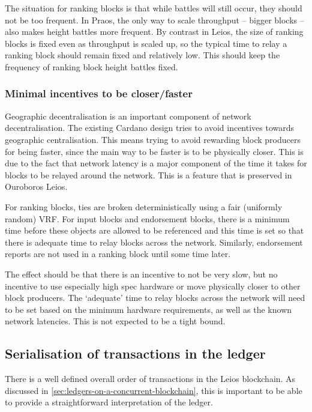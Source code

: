 \documentclass[11pt,a4paper]{article}
\begin{document}
The situation for ranking blocks is that while battles will still occur, they
should not be too frequent. In Praos, the only way to scale throughput --
bigger blocks -- also makes height battles more frequent. By contrast in Leios,
the size of ranking blocks is fixed even as throughput is scaled up, so the
typical time to relay a ranking block should remain fixed and relatively low.
This should keep the frequency of ranking block height battles fixed.

\subsubsection{Minimal incentives to be closer/faster}
Geographic decentralisation is an important component of network
decentralisation. The existing Cardano design tries to avoid incentives
towards geographic centralisation. This means trying to avoid rewarding block
producers for being faster, since the main way to be faster is to be physically
closer. This is due to the fact that network latency is a major component of
the time it takes for blocks to be relayed around the network. This is a
feature that is preserved in Ouroboros Leios.

For ranking blocks, ties are broken deterministically using a fair (uniformly
random) VRF. For input blocks and endorsement blocks, there is a minimum time
before these objects are allowed to be referenced and this time is set so that
there is adequate time to relay blocks across the network. Similarly,
endorsement reports are not used in a ranking block until some time later.

The effect should be that there is an incentive to not be very slow, but no
incentive to use especially high spec hardware or move physically closer to
other block producers. The `adequate' time to relay blocks across the network
will need to be set based on the minimum hardware requirements, as well as the
known network latencies. This is not expected to be a tight bound.

\subsection{Serialisation of transactions in the ledger}
\label{sec:serialisation-of-transactions-in-the-ledger}

There is a well defined overall order of transactions in the Leios blockchain.
As discussed in \cref{sec:ledgers-on-a-concurrent-blockchain}, this is
important to be able to provide a straightforward interpretation of the ledger.
\end{document}
